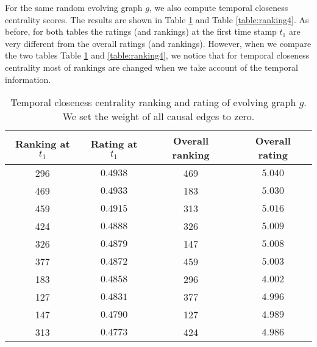 \documentclass[12pt]{article}
\theoremstyle{definition}
\begin{document}
For the same random evolving graph $g$, we also compute temporal closeness centrality scores.
The results are shown in Table \ref{table:ranking3} and Table \ref{table:ranking4}.
As before, for both tables the ratings (and rankings) at the first
time stamp $t_1$ are very different from the overall ratings (and rankings).
However, when we compare the two tables Table \ref{table:ranking3}
and \ref{table:ranking4}, we notice that
for temporal closeness centrality most of rankings are changed when we take account of the temporal information.

\begin{table}[h]
  \begin{center}
\begin{tabular}{ c | c | c | c }
  Ranking at $t_1$ & Rating at $t_1$ & Overall ranking & Overall rating \\ \hline
   296 & $0.4938$ & 469 & $5.040$ \\
   469 & $0.4933$ & 183 & $5.030$ \\
   459 & $0.4915$ & 313 & $5.016$ \\
   424 & $0.4888$ & 326 & $5.009$ \\
   326 & $0.4879$ & 147 & $5.008$ \\
   377 & $0.4872$ & 459 & $5.003$ \\
   183 & $0.4858$ & 296 & $4.002$ \\
   127 & $0.4831$ & 377 & $4.996$ \\
   147 & $0.4790$ & 127 & $4.989$ \\
   313 & $0.4773$ & 424 & $4.986$ \\
\end{tabular}
\end{center}
\caption{Temporal closeness centrality ranking and rating of evolving graph $g$.
We set the weight of all causal edges to zero.}
\label{table:ranking3}
\end{table}
\end{document}
